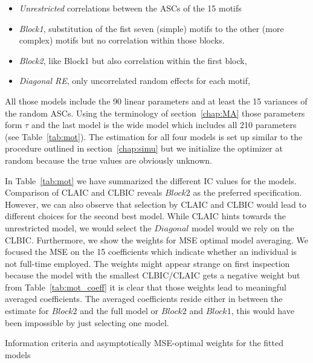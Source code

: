 \documentclass[12pt, a4paper]{article}
\numberwithin{defcounter}{section}
\numberwithin{excounter}{section}
\begin{document}
\begin{itemize}
\item \textit{Unrestricted} correlations between the \ac{ASC}s of the 15 motifs
\item \textit{Block1}, substitution of the fist seven (simple) motifs to the other (more complex) motifs but no correlation within those blocks.
\item \textit{Block2}, like Block1 but also correlation within the first block,
\item \textit{Diagonal RE}, only uncorrelated random effects for each motif,
\end{itemize}
All those models include the 90 linear parameters and at least the 15 variances of the random ASCs. Using the terminology of section~\ref{chap:MA} those parameters form $\tau$ and the last model is the wide model which includes all 210 parameters (see Table~\ref{tab:mot}). The estimation for all four models is set up similar to the procedure outlined in section~\ref{chap:simu} but we initialize the optimizer at random because the true values are obviously unknown. 

In Table~\ref{tab:mot} we have summarized the different  \ac{IC} values for the models. Comparison of \ac{CLAIC} and \ac{CLBIC} reveals $Block2$ as the preferred specification. However, we can also observe that selection by \ac{CLAIC} and \ac{CLBIC} would lead to different choices for the second best model. While \ac{CLAIC} hints towards the unrestricted model, we would select the $Diagonal$ model would we rely on the \ac{CLBIC}. Furthermore, we show the weights for \ac{MSE} optimal model averaging. We focused the \ac{MSE} on the 15 coefficients which indicate whether an individual is not full-time employed. The weights might appear strange on first inspection because the model with the smallest \ac{CLBIC}/\ac{CLAIC} gets a negative weight but from Table~\ref{tab:mot_coeff} it is clear that those weights lead to meaningful averaged coefficients. The averaged coefficients reside either in between the estimate for $Block2$ and the full model or $Block2$ and $Block1$, this would have been impossible by just selecting one model. 

\begin{table}[t]
\centering
\caption{Information criteria and asymptotically \ac{MSE}-optimal weights for the fitted models}

\label{tab:mot}
\end{table}
\end{document}
